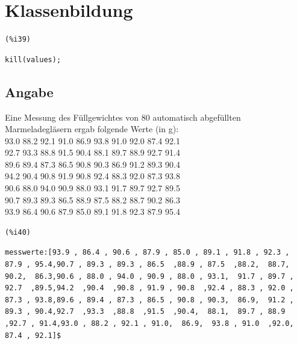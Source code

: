 \documentclass[12pt]{article}
\begin{document}
\section{Klassenbildung}



\noindent
\begin{minipage}[t]{8ex}{\color{red}\bf
\begin{verbatim}
(%i39) 
\end{verbatim}}
\end{minipage}
\begin{minipage}[t]{\textwidth}{\color{blue}
\begin{verbatim}
kill(values);
\end{verbatim}}
\end{minipage}



\subsection{Angabe}


Eine Messung des Füllgewichtes von 80 automatisch abgefüllten Marmeladegläsern ergab folgende Werte (in g): \\
93.0  88.2  92.1  91.0  86.9  93.8  91.0  92.0  87.4  92.1 \\
92.7  93.3  88.8  91.5  90.4  88.1  89.7  88.9  92.7  91.4 \\
89.6  89.4  87.3  86.5  90.8  90.3  86.9  91.2  89.3  90.4 \\
94.2  90.4  90.8  91.9  90.8  92.4  88.3  92.0  87.3  93.8 \\
90.6  88.0  94.0  90.9  88.0  93.1  91.7  89.7  92.7  89.5 \\
90.7  89.3  89.3  86.5  88.9  87.5  88.2  88.7  90.2  86.3 \\
93.9  86.4  90.6  87.9  85.0  89.1  91.8  92.3  87.9  95.4 

\noindent
\begin{minipage}[t]{8ex}{\color{red}\bf
\begin{verbatim}
(%i40) 
\end{verbatim}}
\end{minipage}
\begin{minipage}[t]{\textwidth}{\color{blue}
\begin{verbatim}
messwerte:[93.9 , 86.4 , 90.6 , 87.9 , 85.0 , 89.1 , 91.8 , 92.3 , 87.9 , 95.4,90.7 , 89.3 , 89.3 , 86.5  ,88.9 , 87.5  ,88.2,  88.7,  90.2,  86.3,90.6 , 88.0 , 94.0 , 90.9 , 88.0 , 93.1,  91.7 , 89.7 , 92.7  ,89.5,94.2  ,90.4  ,90.8 , 91.9 , 90.8  ,92.4 , 88.3 , 92.0 , 87.3 , 93.8,89.6 , 89.4 , 87.3 , 86.5 , 90.8 , 90.3,  86.9,  91.2 , 89.3 , 90.4,92.7  ,93.3  ,88.8  ,91.5  ,90.4,  88.1,  89.7 , 88.9  ,92.7 , 91.4,93.0 , 88.2 , 92.1 , 91.0,  86.9,  93.8 , 91.0  ,92.0,  87.4 , 92.1]$
\end{verbatim}}
\end{minipage}
\end{document}
